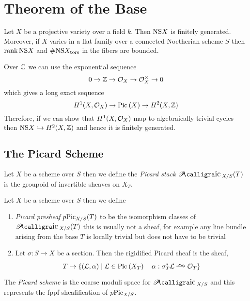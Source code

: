 \documentclass[12pt]{article}
\begin{document}
\section{Theorem of the Base}

\begin{theorem}
Let $X$ be a projective variety over a field $k$. Then $\mathrm{NS}{X}$ is finitely generated. Moreover, if $X$ varies in a flat family over a connected Noetherian scheme $S$ then $\operatorname{\mathrm{rank}}{\mathrm{NS}{X}}$ and $\# \mathrm{NS}{X}_{\mathrm{tors}}$ in the fibers are bounded. 
\end{theorem}

Over $\mathbb{C}$ we can use the exponential sequence
\[ 0 \to \mathbb{Z} \to \mathcal{O}_{X} \to \mathcal{O}_{X}^\times \to 0 \]
which gives a long exact sequence
\[ H^1(X, \mathcal{O}_{X}) \to \mathrm{Pic}^{} \left( X \right) \to H^2(X, \mathbb{Z}) \]
Therefore, if we can show that $H^1(X, \mathcal{O}_{X})$ map to algebraically trivial cycles then $\mathrm{NS}{X} \hookrightarrow H^2(X, \mathbb{Z})$ and hence it is finitely generated. 

\subsection{The Picard Scheme}

\begin{defn}
Let $X$ be a scheme over $S$ then we define the \textit{Picard stack} $\cPic_{X/S}(T)$ is the groupoid of invertible sheaves on $X_T$. 
\end{defn}

\begin{defn}
Let $X$ be a scheme over $S$ then we define 
\begin{enumerate}
\item \textit{Picard presheaf} $p \mathrm{Pic}_{X/S}(T)$ to be the isomorphism classes of $\cPic_{X/S}(T)$ this is usually not a sheaf, for example any line bundle arising from the base $T$ is locally trivial but does not have to be trivial
\item Let $\sigma : S \to X$ be a section. Then the rigidified Picard sheaf is the sheaf,
\[ T \mapsto \{ (\L, \alpha) \mid \L \in \Pic{X_T} \quad \alpha : \sigma_T^* \L \iso \struct{T} \} \]
\end{enumerate} 
\end{defn}

\begin{defn}
The \textit{Picard scheme} is the coarse moduli space for $\cPic_{X/S}$ and this represents the fppf sheafification of $p \mathrm{Pic}_{X/S}$.
\end{defn}
\end{document}
